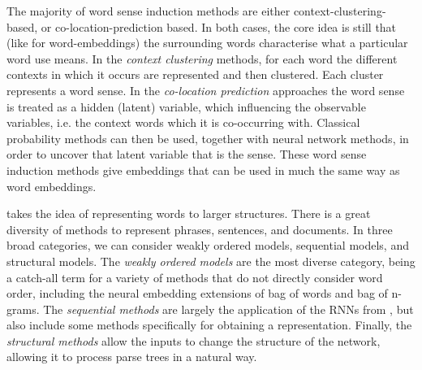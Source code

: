 \documentclass[12pt,parskip]{komatufte}
\begin{document}
The majority of word sense induction methods are either context-clustering-based, or co-location-prediction based.
In both cases, the core idea is still that (like for word-embeddings) the surrounding words characterise what a particular word use means.
In the \emph{context clustering} methods, for each word the different contexts in which it occurs are represented and then clustered.
Each cluster represents a word sense.
In the \emph{co-location prediction} approaches the word sense is treated as a hidden (latent) variable,
which influencing the observable variables, i.e. the context words which it is co-occurring with.
Classical probability methods can then be used, together with neural network methods, in order to uncover that latent variable that is the sense.
These word sense induction methods give embeddings that can be used in much the same way as word embeddings.



 takes the idea of representing words to larger structures.
There is a great diversity of methods to represent phrases, sentences, and documents.
In three broad categories, we can consider weakly ordered models, sequential models, and structural models.
The \emph{weakly ordered models} are the most diverse category, being a catch-all term for a variety of methods that do not directly consider word order, including the neural embedding extensions of bag of words and bag of n-grams.
The \emph{sequential methods} are largely the application of the RNNs from ,
but also include some methods specifically for obtaining a representation.
Finally, the \emph{structural methods} allow the inputs to change the structure of the network,
allowing it to process parse trees in a natural way.
\end{document}
